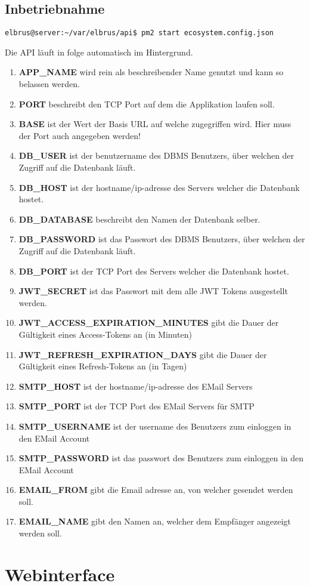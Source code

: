 \documentclass{article}
\begin{document}
	\subsection{Inbetriebnahme}
	\begin{lstlisting}[caption={Starten der API.}]
		elbrus@server:~/var/elbrus/api$ pm2 start ecosystem.config.json
	\end{lstlisting}
	Die API läuft in folge automatisch im Hintergrund.
	\newpage
	\begin{enumerate}
		\item \textbf{APP\_NAME} wird rein als beschreibender Name genutzt und kann so belassen werden.
		\item \textbf{PORT} beschreibt den TCP Port auf dem die Applikation laufen soll.
		\item \textbf{BASE} ist der Wert der Basis URL auf welche zugegriffen wird. Hier muss der Port auch angegeben werden!
		\item \textbf{DB\_USER} ist der benutzername des DBMS Benutzers, über welchen der Zugriff auf die Datenbank läuft.
		\item \textbf{DB\_HOST} ist der hostname/ip-adresse des Servers welcher die Datenbank hostet.
		\item \textbf{DB\_DATABASE} beschreibt den Namen der Datenbank selber.
		\item \textbf{DB\_PASSWORD} ist das Passwort des DBMS Benutzers, über welchen der Zugriff auf die Datenbank läuft.
		\item \textbf{DB\_PORT} ist der TCP Port des Servers welcher die Datenbank hostet.
		\item \textbf{JWT\_SECRET} ist das Passwort mit dem alle JWT Tokens ausgestellt werden.
		\item \textbf{JWT\_ACCESS\_EXPIRATION\_MINUTES} gibt die Dauer der Gültigkeit eines Access-Tokens an (in Minuten)
		\item \textbf{JWT\_REFRESH\_EXPIRATION\_DAYS} gibt die Dauer der Gültigkeit eines Refresh-Tokens an (in Tagen)
		\item \textbf{SMTP\_HOST} ist der hostname/ip-adresse des EMail Servers
		\item \textbf{SMTP\_PORT} ist der TCP Port des EMail Servers für SMTP
		\item \textbf{SMTP\_USERNAME} ist der username des Benutzers zum einloggen in den EMail Account
		\item \textbf{SMTP\_PASSWORD} ist das passwort des Benutzers zum einloggen in den EMail Account
		\item \textbf{EMAIL\_FROM} gibt die Email adresse an, von welcher gesendet werden soll.
		\item \textbf{EMAIL\_NAME} gibt den Namen an, welcher dem Empfänger angezeigt werden soll.
	\end{enumerate}
	\newpage
	
	\section{Webinterface}
	\newpage
\end{document}
